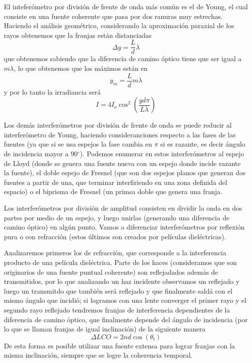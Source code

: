 \documentclass[a4paper,spanish]{article}
\numberwithin{equation}{section}
\begin{document}
	El intefer\'ometro por divisi\'on de frente de onda m\'as com\'un es el de Young, el cual consiste en una fuente coherente que pasa por dos ranuras muy estrechas. Haciendo el an\'alisis geom\'etrico, considerando la aproximaci\'on paraxial de los rayos obtenemos que la franjas est\'an distanciadas
	\begin{equation}
		\Delta y = \frac{L}{d}\lambda
		\label{eq:interferencia_young_interfranja}
	\end{equation}
	que obtenemos sabiendo que la diferencia de camino \'optico tiene que ser igual a $m\lambda$, lo que obtenemos que los m\'aximos est\'an en 
	\begin{equation}
		y_m = \frac{L}{d} m \lambda
		\label{eq:interferencia_young_maximos}
	\end{equation}
	y por lo tanto la irradiancia ser\'a
	\begin{equation}
		I = 4 I_o \cos^2\left(\frac{y d \pi}{L\lambda}\right)
		\label{eq:interferencia_young_irradiancia}
	\end{equation}
	
	Los dem\'as interfer\'ometros por divisi\'on de frente de onda se puede reducir al interfer\'ometro de Young, haciendo consideranciones respecto a las fases de las fuentes (ya que si se usa espejos la fase cambia en $\pi$ si es razante, es decir \'angulo de incidencia mayor a 90$^\circ$). Podemos enumerar en estos interfer\'ometros al espejo de Lloyd (donde se genera una fuente nueva con un espejo donde incide razante la fuente), el doble espejo de Fresnel (que son dos espejos planos que generan dos fuentes a partir de una, que terminar interfiriendo en una zona definida del espacio) o el biprisma de Fresnel (un primsa doble que genera una franja.
	
	Los interfer\'ometros por divisi\'on de amplitud consisten en dividir la onda en dos partes por medio de un espejo, y luego unirlas (generando una diferencia de camino \'optico) en alg\'un punto. Vamos a diferenciar interfer\'ometros por reflexi\'on pura o con refracci\'on (estos \'ultimos son creados por pel\'iculas diel\'ectricas). 
	
	Analizaremos primeros los de refracci\'on, que corresponde a la interferencia producto de una pel\'icula diel\'ectrica. Parte de los haces (consideramos que son originarios de una fuente puntual coherente) son reflejadados adem\'as de transmitidos, por lo que analizando un haz incidente observamos un reflejado y luego un transmitdo que tambi\'en ser\'a reflejado y que finalmente sald\'a con el mismo \'angulo que incidi\'o; si logramos con una lente converger el primer rayo y el segundo rayo reflejado tendremos franjas de interferencia dependientes de la diferencia de camino \'optico, que finalmente depende del \'angulo de incidencia (por lo que se llaman franjas de igual inclinaci\'on) de la siguiente manera
	\begin{equation}
		\Delta LCO = 2 n d \cos(\theta_t)
		\label{eq:interferencia_franjas_inclinacion}
	\end{equation}
	De esta forma es posible utilizar una fuente extensa para lograr franjas con la misma inclinaci\'on, siempre que se logre la coherencia temporal.
	
\end{document}
